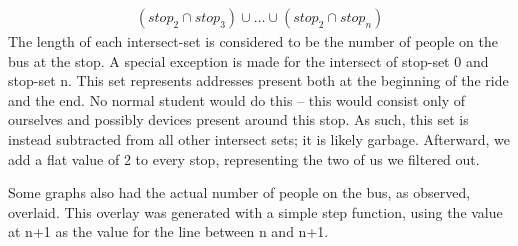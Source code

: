 \begin{itemize}
\begin{multline*}
    \left(stop_2 \cap stop_3\right) \cup \dots \cup \left(stop_2 \cap stop_n\right)
  \end{multline*}
  The length of each intersect-set is considered to be the number of people on the bus at the stop.
  A special exception is made for the intersect of stop-set 0 and stop-set n.
  This set represents addresses present both at the beginning of the ride and the end.
  No normal student would do this -- this would consist only of ourselves and possibly devices present around this stop.
  As such, this set is instead subtracted from all other intersect sets; it is likely garbage.
  Afterward, we add a flat value of 2 to every stop, representing the two of us we filtered out.
\end{itemize}
Some graphs also had the actual number of people on the bus, as observed, overlaid.
This overlay was generated with a simple step function, using the value at n+1 as the value for the line between n and n+1.
